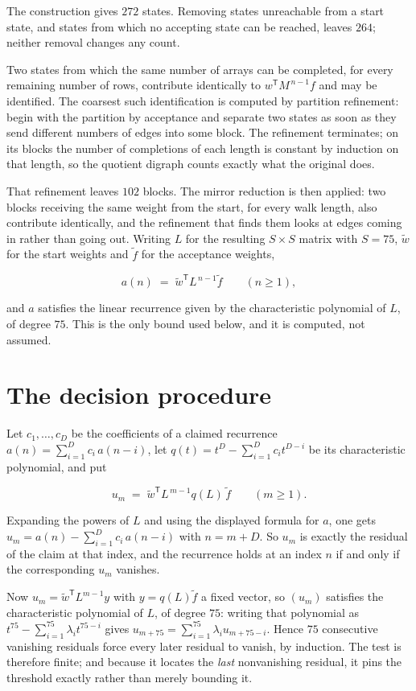 \documentclass[11pt]{article}
\theoremstyle{definition}
\begin{document}
The construction gives $272$ states. Removing states unreachable from a start state, and states from which no accepting state can be reached, leaves $264$; neither removal changes any count.

Two states from which the same number of arrays can be completed, for every remaining number of rows, contribute identically to $w^{\mathsf T}M^{\,n-1}f$ and may be identified. The coarsest such identification is computed by partition refinement: begin with the partition by acceptance and separate two states as soon as they send different numbers of edges into some block. The refinement terminates; on its blocks the number of completions of each length is constant by induction on that length, so the quotient digraph counts exactly what the original does.

That refinement leaves $102$ blocks. The mirror reduction is then applied: two blocks receiving the same weight from the start, for every walk length, also contribute identically, and the refinement that finds them looks at edges coming in rather than going out. Writing $L$ for the resulting $S \times S$ matrix with $S = 75$, $\tilde w$ for the start weights and $\tilde f$ for the acceptance weights,

\[a(n) \;=\; \tilde w^{\mathsf T} L^{\,n-1} \tilde f \qquad (n \ge 1),\]

and $a$ satisfies the linear recurrence given by the characteristic polynomial of $L$, of degree $75$. This is the only bound used below, and it is computed, not assumed.

\section{The decision procedure}

Let $c_1,\dots,c_D$ be the coefficients of a claimed recurrence $a(n) = \sum_{i=1}^{D} c_i\,a(n-i)$, let $q(t) = t^{D} - \sum_{i=1}^{D} c_i t^{D-i}$ be its characteristic polynomial, and put

\[u_m \;=\; \tilde w^{\mathsf T} L^{\,m-1} q(L)\,\tilde f \qquad (m \ge 1).\]

Expanding the powers of $L$ and using the displayed formula for $a$, one gets $u_m = a(n) - \sum_{i=1}^{D} c_i\,a(n-i)$ with $n = m + D$. So $u_m$ is exactly the residual of the claim at that index, and the recurrence holds at an index $n$ if and only if the corresponding $u_m$ vanishes.

Now $u_m = \tilde w^{\mathsf T} L^{m-1} y$ with $y = q(L)\tilde f$ a fixed vector, so $(u_m)$ satisfies the characteristic polynomial of $L$, of degree $75$: writing that polynomial as $t^{75} - \sum_{i=1}^{75} \lambda_i t^{75-i}$ gives $u_{m+75} = \sum_{i=1}^{75} \lambda_i u_{m+75-i}$. Hence $75$ consecutive vanishing residuals force every later residual to vanish, by induction. The test is therefore finite; and because it locates the {\itshape last} nonvanishing residual, it pins the threshold exactly rather than merely bounding it.
\end{document}
